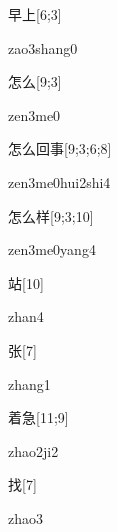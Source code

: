 \begin{verbete}{早上}[6;3]
\begin{pronuncia}{zao3shang0}
\end{pronuncia}
\end{verbete}

\begin{verbete}[zen3me0]{怎么}[9;3]
\begin{pronuncia}{zen3me0}
\end{pronuncia}
\end{verbete}

\begin{verbete}{怎么回事}[9;3;6;8]
\begin{pronuncia}[\\]{zen3me0hui2shi4}
\end{pronuncia}
\end{verbete}

\begin{verbete}{怎么样}[9;3;10]
\begin{pronuncia}{zen3me0yang4}
\end{pronuncia}
\end{verbete}

\begin{verbete}[zhan4]{站}[10]
\begin{pronuncia}{zhan4}
\end{pronuncia}
\end{verbete}

\begin{verbete}[zhang1]{张}[7]
\begin{pronuncia}{zhang1}
\end{pronuncia}
\end{verbete}

\begin{verbete}[zhao2ji2]{着急}[11;9]
\begin{pronuncia}{zhao2ji2}
\end{pronuncia}
\end{verbete}

\begin{verbete}[zhao3]{找}[7]
\begin{pronuncia}{zhao3}
\end{pronuncia}
\end{verbete}

